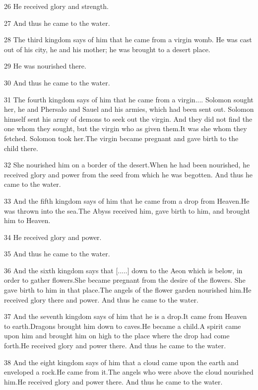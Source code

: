 \par 26 He received glory and strength.
\par 27 And thus he came to the water.
\par 28 The third kingdom says of him that he came from a virgin womb. He was cast out of his city, he and his mother; he was brought to a desert place.

\par 29 He was nourished there.
\par 30 And thus he came to the water.
\par 31 The fourth kingdom says of him that he came from a virgin.... Solomon sought her, he and Phersalo and Sauel and his armies, which had been sent out. Solomon himself sent his army of demons to seek out the virgin. And they did not find the one whom they sought, but the virgin who as given them.It was she whom they fetched. Solomon took her.The virgin became pregnant and gave birth to the child there.

\par 32 She nourished him on a border of the desert.When he had been nourished, he received glory and power from the seed from which he was begotten. And thus he came to the water.

\par 33 And the fifth kingdom says of him that he came from a drop from Heaven.He was thrown into the sea.The Abyss received him, gave birth to him, and brought him to Heaven.
\par 34 He received glory and power.
\par 35 And thus he came to the water.
\par 36 And the sixth kingdom says that [.....] down to the Aeon which is below, in order to gather flowers.She became pregnant from the desire of the flowers. She gave birth to him in that place.The angels of the flower garden nourished him.He received glory there and power. And thus he came to the water.

\par 37 And the seventh kingdom says of him that he is a drop.It came from Heaven to earth.Dragons brought him down to caves.He became a child.A spirit came upon him and brought him on high to the place where the drop had come forth.He received glory and power there. And thus he came to the water.

\par 38 And the eight kingdom says of him that a cloud came upon the earth and enveloped a rock.He came from it.The angels who were above the cloud nourished him.He received glory and power there. And thus he came to the water.

